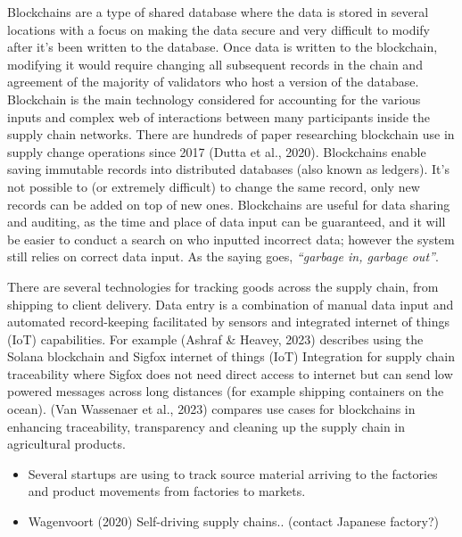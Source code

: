 \documentclass[
  letterpaper,
  DIV=11,
  numbers=noendperiod]{scrartcl}
\begin{document}
Blockchains are a type of shared database where the data is stored in
several locations with a focus on making the data secure and very
difficult to modify after it's been written to the database. Once data
is written to the blockchain, modifying it would require changing all
subsequent records in the chain and agreement of the majority of
validators who host a version of the database. Blockchain is the main
technology considered for accounting for the various inputs and complex
web of interactions between many participants inside the supply chain
networks. There are hundreds of paper researching blockchain use in
supply change operations since 2017 (Dutta et al., 2020). Blockchains
enable saving immutable records into distributed databases (also known
as ledgers). It's not possible to (or extremely difficult) to change the
same record, only new records can be added on top of new ones.
Blockchains are useful for data sharing and auditing, as the time and
place of data input can be guaranteed, and it will be easier to conduct
a search on who inputted incorrect data; however the system still relies
on correct data input. As the saying goes, \emph{``garbage in, garbage
out''}.

There are several technologies for tracking goods across the supply
chain, from shipping to client delivery. Data entry is a combination of
manual data input and automated record-keeping facilitated by sensors
and integrated internet of things (IoT) capabilities. For example
(Ashraf \& Heavey, 2023) describes using the Solana blockchain and
Sigfox internet of things (IoT) Integration for supply chain
traceability where Sigfox does not need direct access to internet but
can send low powered messages across long distances (for example
shipping containers on the ocean). (Van Wassenaer et al., 2023) compares
use cases for blockchains in enhancing traceability, transparency and
cleaning up the supply chain in agricultural products.

\begin{itemize}
\item
  Several startups are using to track source material arriving to the
  factories and product movements from factories to markets.
\item
  Wagenvoort (2020) Self-driving supply chains.. (contact Japanese
  factory?)
\end{itemize}
\end{document}
